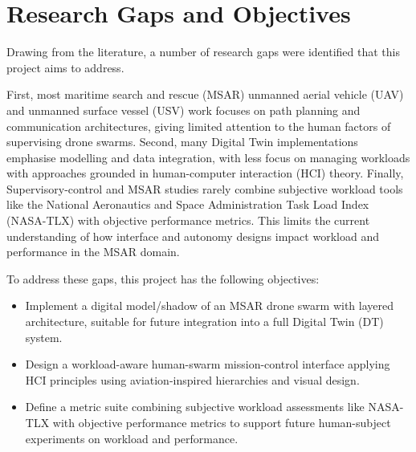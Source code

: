 \section{Research Gaps and Objectives}\label{sec:research-gaps-and-objectives}

Drawing from the literature, a number of research gaps were identified that this project aims to address.

First, most maritime search and rescue (MSAR) unmanned aerial vehicle (UAV) and unmanned surface vessel (USV) work focuses on path planning and communication architectures, giving limited attention to the human factors of supervising drone swarms.
Second, many Digital Twin implementations emphasise modelling and data integration, with less focus on managing workloads with approaches grounded in human-computer interaction (HCI) theory.
Finally, Supervisory-control and MSAR studies rarely combine subjective workload tools like the National Aeronautics and Space Administration Task Load Index (NASA-TLX) with objective performance metrics.
This limits the current understanding of how interface and autonomy designs impact workload and performance in the MSAR domain.

To address these gaps, this project has the following objectives:

\begin{itemize}
    \item Implement a digital model/shadow of an MSAR drone swarm with layered architecture, suitable for future integration into a full Digital Twin (DT) system.
    \item Design a workload-aware human-swarm mission-control interface applying HCI principles using aviation-inspired hierarchies and visual design.
    \item Define a metric suite combining subjective workload assessments like NASA-TLX with objective performance metrics to support future human-subject experiments on workload and performance.
\end{itemize}
